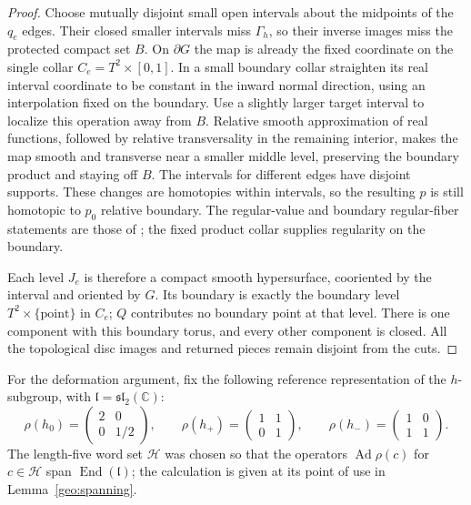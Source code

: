 \begin{proof}
Choose mutually disjoint small open intervals about the midpoints
of the $q_e$ edges.  Their closed smaller intervals miss
$\Gamma_h$, so their inverse images miss the protected compact
set $B$.  On $\partial G$ the map is already the fixed coordinate
on the single collar $C_e=T^2\times[0,1]$.  In a small boundary
collar straighten its real interval coordinate to be constant
in the inward normal direction, using an interpolation fixed
on the boundary.  Use a slightly larger target interval to
localize this operation away from $B$.  Relative smooth
approximation of real functions, followed by relative
transversality in the remaining interior, makes the map smooth
and transverse near a smaller middle level, preserving the
boundary product and staying off $B$.  The intervals for
different edges have disjoint supports.  These changes are
homotopies within intervals, so the resulting $p$ is still
homotopic to $p_0$ relative boundary. The regular-value and boundary
regular-fiber statements are those of \cite[Section~2, pp.~10--13]{Milnor1965};
the fixed product collar supplies regularity on the boundary.

Each level $J_e$ is therefore a compact smooth hypersurface,
cooriented by the interval and oriented by $G$.  Its boundary
is exactly the boundary level $T^2\times\{\mathrm{point}\}$
in $C_e$; $Q$ contributes no boundary point at that level.
There is one component with this boundary torus, and every
other component is closed.  All the topological disc images
and returned pieces remain disjoint from the cuts.
\end{proof}

For the deformation argument, fix the following reference representation
of the $h$-subgroup, with $\mathfrak l=\mathfrak{sl}_2(\mathbb C)$:
\begin{equation}\label{geo:matrices}
 \rho(h_0)=\begin{pmatrix}2&0\\0&1/2\end{pmatrix},\qquad
 \rho(h_+)=\begin{pmatrix}1&1\\0&1\end{pmatrix},\qquad
 \rho(h_-)=\begin{pmatrix}1&0\\1&1\end{pmatrix}.
\end{equation}
The length-five word set $\mathcal H$ was chosen so that the operators
$\operatorname{Ad}\rho(c)$ for $c\in\mathcal H$ span
$\operatorname{End}(\mathfrak l)$; the calculation is given
at its point of use in Lemma~\ref{geo:spanning}.

